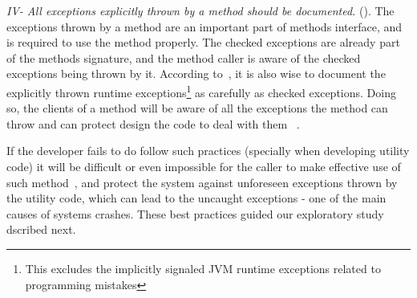 \documentclass[conference]{IEEEtran}
\begin{document}

\emph{IV- All exceptions explicitly thrown by a method should be documented.}
(\cite{mandrioli1992advances,gosling2000java,wirfs2006toward,bloch2008effective}).
The exceptions thrown by a method are an important part of methods interface,
and is required to use the method properly. The checked exceptions are already
part of the  methods signature, and the method caller is aware of the checked
exceptions being thrown by it. According to~\cite{bloch2008effective}, it is
also wise to document the explicitly thrown runtime exceptions\footnote{This
excludes the implicitly signaled JVM runtime exceptions related to programming
mistakes} as carefully as checked exceptions. Doing so, the clients of a method
will be aware of all the exceptions the method can throw and can protect design the code
to deal with them ~\cite{Robil00}. 

If the developer fails to do follow such practices (specially when developing 
utility code) it will be difficult or even impossible for the caller to 
make effective use of such method~\cite{wirfs2006toward, bloch2008effective},
and protect the system against unforeseen exceptions thrown by the utility code,
which can lead to the uncaught exceptions - one of the main causes of 
systems crashes. These best practices guided our exploratory study dscribed next.




\end{document}
